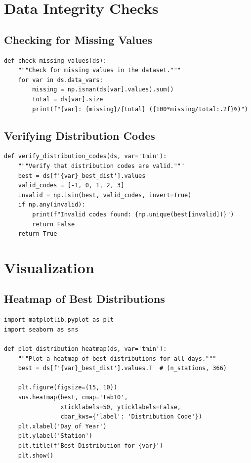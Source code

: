 ﻿\documentclass[12pt,a4paper]{report}
\begin{document}
\section{Data Integrity Checks}

\subsection{Checking for Missing Values}
\begin{lstlisting}[caption=Checking for Missing Values]
def check_missing_values(ds):
    """Check for missing values in the dataset."""
    for var in ds.data_vars:
        missing = np.isnan(ds[var].values).sum()
        total = ds[var].size
        print(f"{var}: {missing}/{total} ({100*missing/total:.2f}%)")
\end{lstlisting}

\subsection{Verifying Distribution Codes}
\begin{lstlisting}[caption=Verifying Distribution Codes]
def verify_distribution_codes(ds, var='tmin'):
    """Verify that distribution codes are valid."""
    best = ds[f'{var}_best_dist'].values
    valid_codes = [-1, 0, 1, 2, 3]
    invalid = np.isin(best, valid_codes, invert=True)
    if np.any(invalid):
        print(f"Invalid codes found: {np.unique(best[invalid])}")
        return False
    return True
\end{lstlisting}

\section{Visualization}

\subsection{Heatmap of Best Distributions}
\begin{lstlisting}[caption=Heatmap of Best Distributions]
import matplotlib.pyplot as plt
import seaborn as sns

def plot_distribution_heatmap(ds, var='tmin'):
    """Plot a heatmap of best distributions for all days."""
    best = ds[f'{var}_best_dist'].values.T  # (n_stations, 366)

    plt.figure(figsize=(15, 10))
    sns.heatmap(best, cmap='tab10', 
                xticklabels=50, yticklabels=False,
                cbar_kws={'label': 'Distribution Code'})
    plt.xlabel('Day of Year')
    plt.ylabel('Station')
    plt.title(f'Best Distribution for {var}')
    plt.show()
\end{lstlisting}
\end{document}
